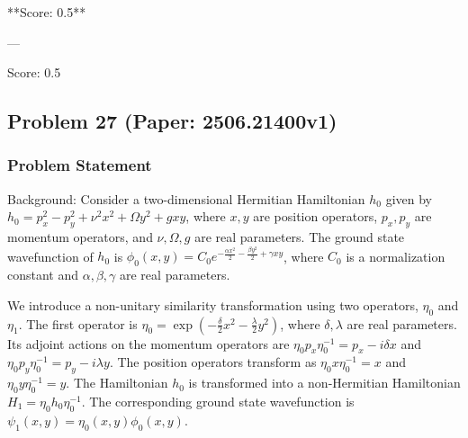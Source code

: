 \documentclass[10pt]{article}
\begin{document}
**Score: 0.5**

---

Score: 0.5

\newpage
\subsection*{Problem 27 (Paper: 2506.21400v1)}
\subsubsection*{Problem Statement}
Background:
Consider a two-dimensional Hermitian Hamiltonian $h_0$ given by $h_0 = p_x^2 - p_y^2 + \nu^2 x^2 + \Omega y^2 + g x y$, where $x, y$ are position operators, $p_x, p_y$ are momentum operators, and $\nu, \Omega, g$ are real parameters. The ground state wavefunction of $h_0$ is $\phi_0(x,y) = C_0 e^{-\frac{\alpha x^2}{2}-\frac{\beta y^2}{2} +\gamma x y}$, where $C_0$ is a normalization constant and $\alpha, \beta, \gamma$ are real parameters.

We introduce a non-unitary similarity transformation using two operators, $\eta_0$ and $\eta_1$.
The first operator is $\eta_0 = \exp\left( -\frac{\delta}{2} x^2 -\frac{\lambda}{2} y^2 \right)$, where $\delta, \lambda$ are real parameters. Its adjoint actions on the momentum operators are $\eta_0 p_x \eta_0^{-1} = p_x - i \delta x$ and $\eta_0 p_y \eta_0^{-1} = p_y - i \lambda y$. The position operators transform as $\eta_0 x \eta_0^{-1} = x$ and $\eta_0 y \eta_0^{-1} = y$.
The Hamiltonian $h_0$ is transformed into a non-Hermitian Hamiltonian $H_1 = \eta_0 h_0 \eta_0^{-1}$. The corresponding ground state wavefunction is $\psi_1(x,y) = \eta_0(x,y) \phi_0(x,y)$.
\end{document}
